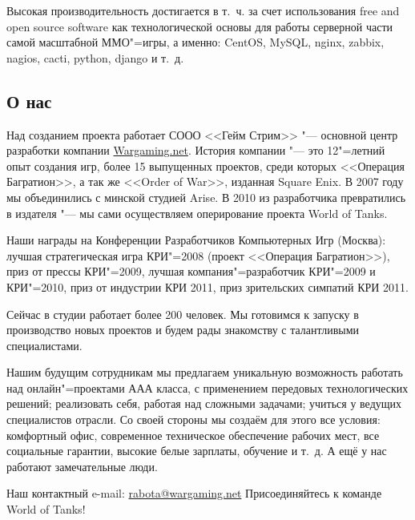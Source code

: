 \documentclass[10pt, a5paper]{article}
\begin{document}
Высокая производительность достигается в т.~ч. за счет использования
free and open source software  как технологической основы для работы
серверной части самой масштабной ММО"=игры, а именно: CentOS,
MySQL, nginx, zabbix, nagios, cacti, python, django и т.~д.

\subsection*{О нас}

Над созданием проекта работает СООО <<Гейм Стрим>> "--- основной центр разработки
компании \url{Wargaming.net}. История компании "--- это 12"=летний опыт создания игр,
более 15 выпущенных проектов, среди которых <<Операция Багратион>>, а так же
<<Order of War>>, изданная Square Enix. В 2007 году мы объединились с минской
студией Arise. В 2010 из разработчика превратились в издателя "--- мы сами
осуществляем оперирование проекта World of Tanks. 

Наши награды на Конференции Разработчиков Компьютерных Игр (Москва): лучшая стратегическая игра КРИ"=2008 (проект <<Операция Багратион>>),
приз от прессы КРИ"=2009, лучшая компания"=разработчик КРИ"=2009 и КРИ"=2010, приз от индустрии КРИ 2011, приз зрительских симпатий КРИ 2011.

Сейчас в студии работает более 200 человек. Мы готовимся к запуску в
производство новых проектов и будем рады знакомству с талантливыми
специалистами. 

Нашим будущим сотрудникам мы предлагаем уникальную возможность работать над
онлайн"=проектами ААА класса, с применением передовых технологических
решений; реализовать себя, работая над сложными задачами; учиться у ведущих
специалистов отрасли. Со своей стороны мы создаём для этого все условия:
комфортный офис, современное техническое обеспечение рабочих мест, все
социальные гарантии, высокие белые зарплаты, обучение и т.~д. А ещё у нас
работают замечательные люди.

Наш контактный e-mail:  \url{rabota@wargaming.net}
Присоединяйтесь к команде World of Tanks!
\end{document}

